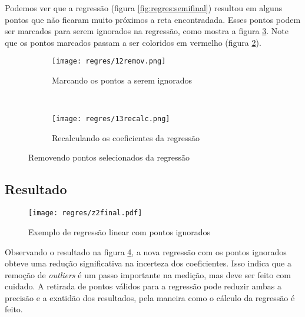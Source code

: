     Podemos ver que a regressão (figura \ref{fig:regres:semifinal}) resultou em alguns pontos que não ficaram muito próximos a reta encontradada. Esses pontos podem ser marcados para serem ignorados na regressão, como mostra a figura \ref{fig:regres:outliers}. Note que os pontos marcados passam a ser coloridos em vermelho (figura \ref{fig:regres:recalc}).

    \begin{figure}[htbp]
        \centering
        \begin{subfigure}{0.35\textwidth}
            \centering
            \texttt{[image: regres/12remov.png]}

            \caption{Marcando os pontos a serem ignorados}
            \label{fig:regres:mask}
        \end{subfigure}
        ~
        \begin{subfigure}{0.35\textwidth}
            \centering
            \texttt{[image: regres/13recalc.png]}

            \caption{Recalculando os coeficientes da regressão}
            \label{fig:regres:recalc}
        \end{subfigure}
        \caption{Removendo pontos selecionados da regressão}
        \label{fig:regres:outliers}
    \end{figure}


\subsection{Resultado}

    \begin{figure}[htbp]
        \centering
        \texttt{[image: regres/z2final.pdf]}

        \caption{Exemplo de regressão linear com pontos ignorados}
        \label{fig:regres:final}
    \end{figure}

    Observando o resultado na figura \ref{fig:regres:final}, a nova regressão com os pontos ignorados obteve uma redução significativa na incerteza dos coeficientes. Isso indica que a remoção de \textit{outliers} é um passo importante na medição, mas deve ser feito com cuidado. A retirada de pontos válidos para a regressão pode reduzir ambas a precisão e a exatidão dos resultados, pela maneira como o cálculo da regressão é feito.
